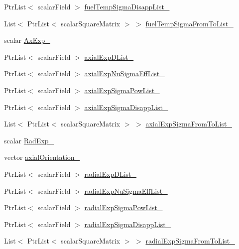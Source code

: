 \begin{DoxyCompactItemize}
\item 
Ptr\+List$<$ scalar\+Field $>$ \hyperlink{classFoam_1_1XSLowMem_adb55e4fd3a655717d7919018ee32045c}{fuel\+Temp\+Sigma\+Disapp\+List\+\_\+}
\item 
List$<$ Ptr\+List$<$ scalar\+Square\+Matrix $>$ $>$ \hyperlink{classFoam_1_1XSLowMem_a0250fdac7dd6025d57959c7c46b2eefa}{fuel\+Temp\+Sigma\+From\+To\+List\+\_\+}
\item 
scalar \hyperlink{classFoam_1_1XSLowMem_a6c7284f6579cd88a4f1e8e2abebcd9e9}{Ax\+Exp\+\_\+}
\item 
Ptr\+List$<$ scalar\+Field $>$ \hyperlink{classFoam_1_1XSLowMem_a349cde89aa9862e228baf7c3be7cc03e}{axial\+Exp\+D\+List\+\_\+}
\item 
Ptr\+List$<$ scalar\+Field $>$ \hyperlink{classFoam_1_1XSLowMem_a7e2217620eb3984c160751e54bf3d15f}{axial\+Exp\+Nu\+Sigma\+Eff\+List\+\_\+}
\item 
Ptr\+List$<$ scalar\+Field $>$ \hyperlink{classFoam_1_1XSLowMem_ac374043dbb221475f4e06e36934756f5}{axial\+Exp\+Sigma\+Pow\+List\+\_\+}
\item 
Ptr\+List$<$ scalar\+Field $>$ \hyperlink{classFoam_1_1XSLowMem_afb3bfd4f175b31844a5d5a1f552bce74}{axial\+Exp\+Sigma\+Disapp\+List\+\_\+}
\item 
List$<$ Ptr\+List$<$ scalar\+Square\+Matrix $>$ $>$ \hyperlink{classFoam_1_1XSLowMem_a8a816b90c2317ba6735ad9071392d21e}{axial\+Exp\+Sigma\+From\+To\+List\+\_\+}
\item 
scalar \hyperlink{classFoam_1_1XSLowMem_a2c773fe264b61d1ee3f73136280c5b21}{Rad\+Exp\+\_\+}
\item 
vector \hyperlink{classFoam_1_1XSLowMem_a7a45b2d3cbea8c88b84341d51fa665c1}{axial\+Orientation\+\_\+}
\item 
Ptr\+List$<$ scalar\+Field $>$ \hyperlink{classFoam_1_1XSLowMem_a8ebf78b2210e6d7f66288988fc6c7050}{radial\+Exp\+D\+List\+\_\+}
\item 
Ptr\+List$<$ scalar\+Field $>$ \hyperlink{classFoam_1_1XSLowMem_aaeacc9ac4b30e1685c3c2115fa4fedd1}{radial\+Exp\+Nu\+Sigma\+Eff\+List\+\_\+}
\item 
Ptr\+List$<$ scalar\+Field $>$ \hyperlink{classFoam_1_1XSLowMem_a5926e12e988c7a3717247957b0ddff91}{radial\+Exp\+Sigma\+Pow\+List\+\_\+}
\item 
Ptr\+List$<$ scalar\+Field $>$ \hyperlink{classFoam_1_1XSLowMem_a4676a6a55f8e7aa4173442a6511038e8}{radial\+Exp\+Sigma\+Disapp\+List\+\_\+}
\item 
List$<$ Ptr\+List$<$ scalar\+Square\+Matrix $>$ $>$ \hyperlink{classFoam_1_1XSLowMem_a1fb3f1d9a8cdb19d7cfde4add417cbdd}{radial\+Exp\+Sigma\+From\+To\+List\+\_\+}

\end{DoxyCompactItemize}

